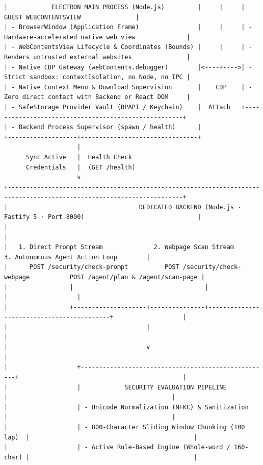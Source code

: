 \documentclass[11pt,a4paper]{article}
\begin{document}
\begin{lstlisting}
|            ELECTRON MAIN PROCESS (Node.js)         |     |     |                 GUEST WEBCONTENTSVIEW               |
| - BrowserWindow (Application Frame)                |     |     | - Hardware-accelerated native web view              |
| - WebContentsView Lifecycle & Coordinates (Bounds) |     |     | - Renders untrusted external websites               |
| - Native CDP Gateway (webContents.debugger)        |<----+---->| - Strict sandbox: contextIsolation, no Node, no IPC |
| - Native Context Menu & Download Supervision       |    CDP    | - Zero direct contact with Backend or React DOM     |
| - SafeStorage Provider Vault (DPAPI / Keychain)    |  Attach   +-----------------------------------------------------+
| - Backend Process Supervisor (spawn / health)      |
+-------------------+--------------------------------+
                    |
      Sync Active   |  Health Check
      Credentials   |  (GET /health)
                    v
+----------------------------------------------------------------------------------------------------------------------+
|                                    DEDICATED BACKEND (Node.js · Fastify 5 · Port 8000)                               |
|                                                                                                                      |
|   1. Direct Prompt Stream              2. Webpage Scan Stream                 3. Autonomous Agent Action Loop        |
|      POST /security/check-prompt          POST /security/check-webpage           POST /agent/plan & /agent/scan-page |
|                 |                                    |                                           |                   |
|                 +--------------------+---------------+-------------------------------------------+                   |
|                                      |                                                                               |
|                                      v                                                                               |
|                   +----------------------------------------------------+                                             |
|                   |            SECURITY EVALUATION PIPELINE            |                                             |
|                   | - Unicode Normalization (NFKC) & Sanitization      |                                             |
|                   | - 800-Character Sliding Window Chunking (100 lap)  |                                             |
|                   | - Active Rule-Based Engine (Whole-word / 160-char) |                                             |

\end{lstlisting}
\end{document}
